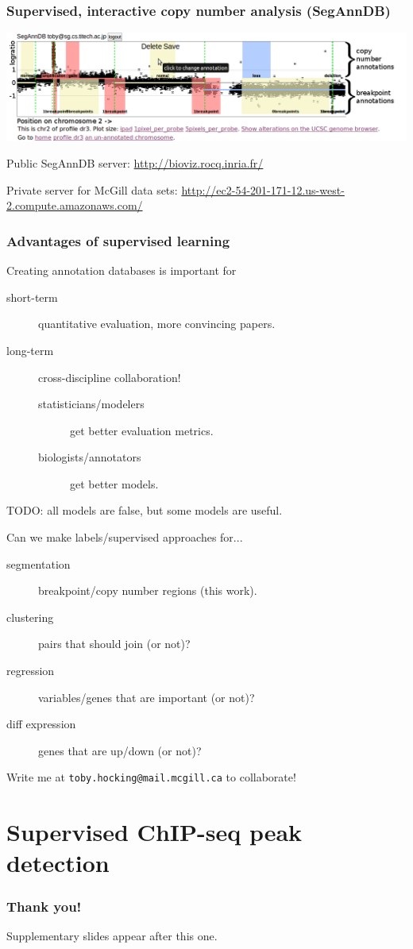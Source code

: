 \documentclass{beamer}
\begin{document}
\begin{frame}
  \frametitle{Supervised, interactive copy number analysis (SegAnnDB)}

\includegraphics[width=\textwidth]{new-new-annotations}

\vskip 0.2in
Public SegAnnDB server: \url{http://bioviz.rocq.inria.fr/}

\vskip 0.1in
Private server for McGill data sets:
\small
\url{http://ec2-54-201-171-12.us-west-2.compute.amazonaws.com/}

\end{frame}

\begin{frame} 
  \frametitle{Advantages of supervised learning}
  Creating annotation databases is important for
  \begin{description}
  \item[short-term] quantitative evaluation, more convincing papers.
  \item[long-term] cross-discipline collaboration!
    \begin{description}
    \item[statisticians/modelers] get better evaluation
    metrics.
    \item[biologists/annotators] get
    better models.
    \end{description}
  \end{description}
  TODO: all models are false, but some models are useful.

  Can we make labels/supervised approaches for...
  \begin{description}
  \item[segmentation] breakpoint/copy number regions (this work).
  \item[clustering] pairs that should join (or not)?
  \item[regression] variables/genes that are important (or not)?
  \item[diff expression] genes that are up/down (or not)?
  \end{description}
  Write me at \texttt{toby.hocking@mail.mcgill.ca} to collaborate!
\end{frame}

\section{Supervised ChIP-seq peak detection}



\begin{frame}
  \frametitle{Thank you!}
  Supplementary slides appear after this one.
\end{frame}
\end{document}
